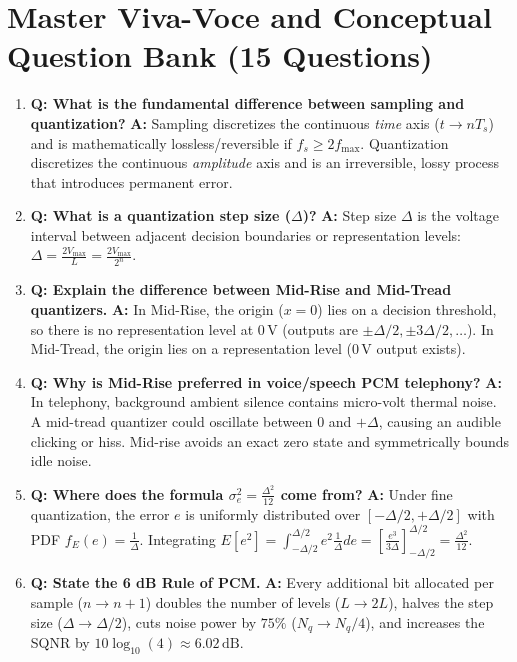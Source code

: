 \documentclass[11pt,a4paper]{article}
\begin{document}
\newpage

\section{Master Viva-Voce and Conceptual Question Bank (15 Questions)}

\begin{enumerate}
    \item \textbf{Q: What is the fundamental difference between sampling and quantization?}  
    \textbf{A:} Sampling discretizes the continuous \textit{time} axis ($t \to n T_s$) and is mathematically lossless/reversible if $f_s \ge 2 f_{\max}$. Quantization discretizes the continuous \textit{amplitude} axis and is an irreversible, lossy process that introduces permanent error.

    \item \textbf{Q: What is a quantization step size ($\Delta$)?}  
    \textbf{A:} Step size $\Delta$ is the voltage interval between adjacent decision boundaries or representation levels: $\Delta = \frac{2 V_{\max}}{L} = \frac{2 V_{\max}}{2^n}$.

    \item \textbf{Q: Explain the difference between Mid-Rise and Mid-Tread quantizers.}  
    \textbf{A:} In Mid-Rise, the origin ($x=0$) lies on a decision threshold, so there is no representation level at $0\,\mathrm{V}$ (outputs are $\pm \Delta/2, \pm 3\Delta/2, \dots$). In Mid-Tread, the origin lies on a representation level ($0\,\mathrm{V}$ output exists).

    \item \textbf{Q: Why is Mid-Rise preferred in voice/speech PCM telephony?}  
    \textbf{A:} In telephony, background ambient silence contains micro-volt thermal noise. A mid-tread quantizer could oscillate between $0$ and $+\Delta$, causing an audible clicking or hiss. Mid-rise avoids an exact zero state and symmetrically bounds idle noise.

    \item \textbf{Q: Where does the formula $\sigma_e^2 = \frac{\Delta^2}{12}$ come from?}  
    \textbf{A:} Under fine quantization, the error $e$ is uniformly distributed over $[-\Delta/2, +\Delta/2]$ with PDF $f_E(e) = \frac{1}{\Delta}$. Integrating $E[e^2] = \int_{-\Delta/2}^{\Delta/2} e^2 \frac{1}{\Delta} de = \left[ \frac{e^3}{3\Delta} \right]_{-\Delta/2}^{\Delta/2} = \frac{\Delta^2}{12}$.

    \item \textbf{Q: State the 6 dB Rule of PCM.}  
    \textbf{A:} Every additional bit allocated per sample ($n \to n+1$) doubles the number of levels ($L \to 2L$), halves the step size ($\Delta \to \Delta/2$), cuts noise power by $75\%$ ($N_q \to N_q/4$), and increases the SQNR by $10 \log_{10}(4) \approx 6.02\,\mathrm{dB}$.


\end{enumerate}
\end{document}
